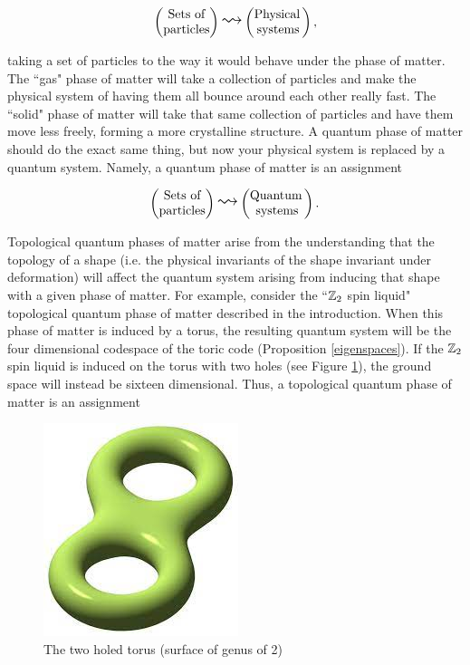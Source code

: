 \documentclass{article}
\theoremstyle{definition}
\numberwithin{figure}{section}
\begin{document}
$$
\begin{pmatrix}
\text{Sets of} \\
\text{particles}
\end{pmatrix}
\bigleadsto
\begin{pmatrix}
\text{Physical\,} \\ \text{systems}
\end{pmatrix},
$$

taking a set of particles to the way it would behave under the phase of matter. The ``gas" phase of matter will take a collection of particles and make the physical system of having them all bounce around each other really fast. The ``solid" phase of matter will take that same collection of particles and have them move less freely, forming a more crystalline structure. A quantum phase of matter should do the exact same thing, but now your physical system is replaced by a quantum system. Namely, a quantum phase of matter is an assignment

$$
\begin{pmatrix}
\text{Sets of} \\
\text{particles}
\end{pmatrix}
\bigleadsto
\begin{pmatrix}
\text{Quantum\,} \\ \text{systems}
\end{pmatrix}.
$$

Topological quantum phases of matter arise from the understanding that the topology of a shape (i.e. the physical invariants of the shape invariant under deformation) will affect the quantum system arising from inducing that shape with a given phase of matter. For example, consider the ``$\mathbb{Z}_2$ spin liquid" topological quantum phase of matter described in the introduction. When this phase of matter is induced by a torus, the resulting quantum system will be the four dimensional codespace of the toric code (Proposition \ref{eigenspaces}). If the $\mathbb{Z}_2$ spin liquid is induced on the torus with two holes (see Figure \ref{fig:genus-two}), the ground space will instead be sixteen dimensional. Thus, a topological quantum phase of matter is an assignment

\begin{figure}
\begin{center}
\includegraphics[scale=0.25]{genus-two}
\caption{The two holed torus (surface of genus of 2)}
\label{fig:genus-two}
\end{center}
\end{figure}
\end{document}

